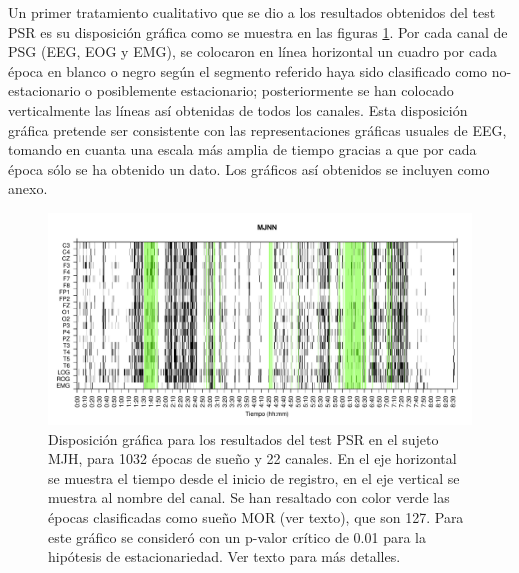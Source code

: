 Un primer tratamiento cualitativo que se dio a los resultados obtenidos del test PSR es su
disposici\'on gr\'afica
como se muestra en las figuras \ref{ejemplo1}.
Por cada canal de PSG (EEG, EOG y EMG), se colocaron en l\'inea horizontal un cuadro por cada
\'epoca en blanco o negro seg\'un el segmento referido haya sido clasificado como
no-estacionario o posiblemente estacionario; posteriormente se han colocado verticalmente las
l\'ineas as\'i obtenidas de todos los canales.
Esta disposici\'on gr\'afica pretende ser consistente con las representaciones gr\'aficas
usuales de EEG, tomando en cuanta una escala m\'as amplia de tiempo gracias a que por
cada \'epoca s\'olo se ha obtenido un dato.
Los gr\'aficos as\'i obtenidos se incluyen como anexo.

\begin{figure}
\includegraphics[width=\textwidth]{MJNNVIGILOS_127_mor127_tot1032_esttotal.pdf} 
\caption{Disposici\'on gr\'afica para los resultados del test PSR en el sujeto MJH, 
para 1032 \'epocas de sue\~no y 22 canales. 
En el eje horizontal se muestra el tiempo desde el inicio de registro, en el eje vertical se muestra al 
nombre del canal. 
Se han resaltado con color verde las \'epocas clasificadas como sue\~no MOR (ver texto), que son 127.
Para este gr\'afico se consider\'o con un p-valor cr\'itico de 0.01 para la hip\'otesis
de estacionariedad. Ver texto para m\'as detalles.}
\label{ejemplo1}
\end{figure}


